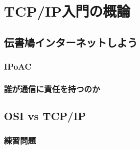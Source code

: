 \chapter{TCP/IP入門の概論}
\section{伝書鳩インターネットしよう}
\subsection{IPoAC}
\subsection{誰が通信に責任を持つのか}
\section{OSI vs TCP/IP}
\subsection{練習問題}